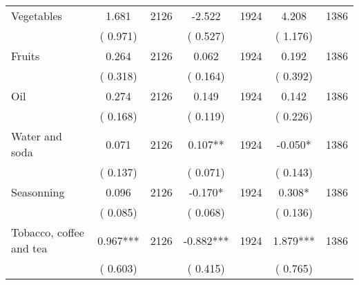 \begin{tabular}{l*{6}{c}}
Vegetables        &              1.681      &       2126       &             -2.522      &       1924       &              4.208      &       1386       \\
                       &       (       0.971)            &                               &       (       0.527)            &                               &       (       1.176)            &                               \\
Fruits        &              0.264      &       2126       &              0.062      &       1924       &              0.192      &       1386       \\
                       &       (       0.318)            &                               &       (       0.164)            &                               &       (       0.392)            &                               \\
Oil        &              0.274      &       2126       &              0.149      &       1924       &              0.142      &       1386       \\
                       &       (       0.168)            &                               &       (       0.119)            &                               &       (       0.226)            &                               \\
Water and soda        &              0.071      &       2126       &              0.107**      &       1924       &             -0.050*      &       1386       \\
                       &       (       0.137)            &                               &       (       0.071)            &                               &       (       0.143)            &                               \\
Seasonning        &              0.096      &       2126       &             -0.170*      &       1924       &              0.308*      &       1386       \\
                       &       (       0.085)            &                               &       (       0.068)            &                               &       (       0.136)            &                               \\
Tobacco, coffee and tea        &              0.967***      &       2126       &             -0.882***      &       1924       &              1.879***      &       1386       \\
                       &       (       0.603)            &                               &       (       0.415)            &                               &       (       0.765)            &                               \\

\end{tabular}
